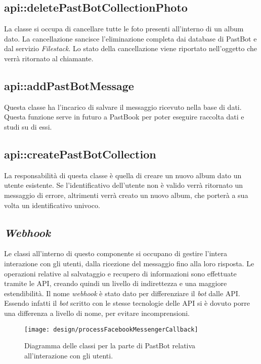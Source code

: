 \subsection{api::deletePastBotCollectionPhoto}

La classe si occupa di cancellare tutte le foto presenti all'interno di un
album dato. La cancellazione sancisce l'eliminazione completa dai database di
PastBot e dal servizio \textit{Filestack}.
Lo stato della cancellazione viene riportato nell'oggetto che verrà ritornato
al chiamante.

\subsection{api::addPastBotMessage}

Questa classe ha l'incarico di salvare il messaggio ricevuto nella base di
dati. Questa funzione serve in futuro a PastBook per poter eseguire raccolta
dati e studi su di essi.

\subsection{api::createPastBotCollection}

La responsabilità di questa classe è quella di creare un nuovo album dato un
utente esistente. Se l'identificativo dell'utente non è valido verrà ritornato
un messaggio di errore, altrimenti verrà creato un nuovo album, che porterà a
sua volta un identificativo univoco.

\subsection{\textit{Webhook}}

Le classi all'interno di questo componente si occupano di gestire l'intera
interazione con gli utenti, dalla ricezione del messaggio fino alla loro
risposta. Le operazioni relative al salvataggio e recupero di informazioni sono
effettuate tramite le API, creando quindi un livello di indirettezza e una
maggiore estendibilità.
Il nome \textit{webhook} è stato dato per differenziare il \textit{bot} dalle
API. Essendo infatti il \textit{bot} scritto con le stesse tecnologie delle API
si è dovuto porre una differenza a livello di nome, per evitare incomprensioni.

\begin{figure}[H]
  \centering
  \texttt{[image: design/processFacebookMessengerCallback]}
  \caption{Diagramma delle classi per la parte di PastBot relativa
all'interazione con gli utenti.}
\end{figure}

